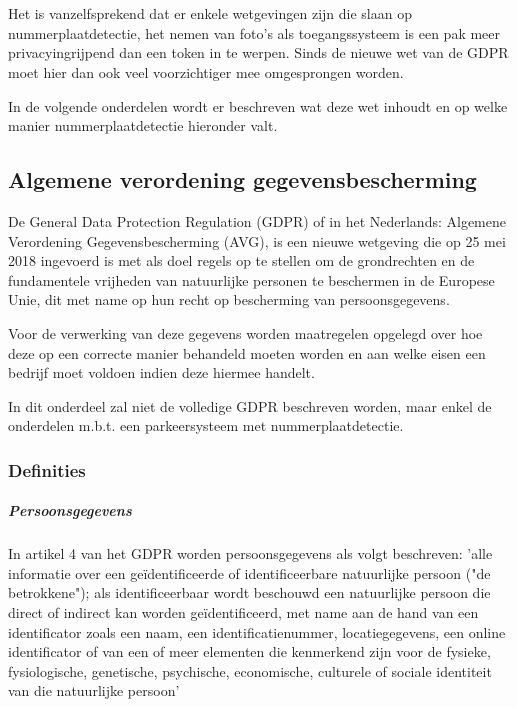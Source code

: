 
\chapter{}
\label{ch:wetgeving-nummerplaatdetectie}

Het is vanzelfsprekend dat er enkele wetgevingen zijn die slaan op nummerplaatdetectie, het nemen van foto's als toegangssysteem is een pak meer privacyingrijpend dan een token in te werpen. Sinds de nieuwe wet van de GDPR moet hier dan ook veel voorzichtiger mee omgesprongen worden.

In de volgende onderdelen wordt er beschreven wat deze wet inhoudt en op welke manier nummerplaatdetectie hieronder valt.

\section{Algemene verordening gegevensbescherming}
De General Data Protection Regulation (GDPR) of in het Nederlands: Algemene Verordening Gegevensbescherming (AVG), is een nieuwe wetgeving die op 25 mei 2018 ingevoerd is met als doel regels op te stellen om de grondrechten en de fundamentele vrijheden van natuurlijke personen te beschermen in de Europese Unie, dit met name op hun recht op bescherming van persoonsgegevens. \autocite{avg2018privacy}

Voor de verwerking van deze gegevens worden maatregelen opgelegd over hoe deze op een correcte manier behandeld moeten worden en aan welke eisen een bedrijf moet voldoen indien deze hiermee handelt.

In dit onderdeel zal niet de volledige GDPR beschreven worden, maar enkel de onderdelen m.b.t. een parkeersysteem met nummerplaatdetectie.

\subsection{Definities}

\paragraph{Persoonsgegevens}
In artikel 4 van het GDPR worden persoonsgegevens als volgt beschreven: 'alle informatie over een geïdentificeerde of identificeerbare natuurlijke persoon ("de betrokkene"); als identificeerbaar wordt beschouwd een natuurlijke persoon die direct of indirect kan worden geïdentificeerd, met name aan de hand van een identificator zoals een naam, een identificatienummer, locatiegegevens, een online identificator of van een of meer elementen die kenmerkend zijn voor de fysieke, fysiologische, genetische, psychische, economische, culturele of sociale identiteit van die natuurlijke persoon' \autocite{avg2018privacy}

